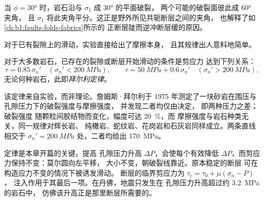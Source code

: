 当 $\phi = \ang{30}$ 时，岩石沿与 $\sigma_1$ 成 \ang{30} 的平面破裂，
两个可能的破裂面彼此成 \ang{60} 夹角，
且 $\sigma_1$ 将此夹角平分。这正是野外所见共轭断层之间的夹角，
也解释了如\cref{ch:b1:faults-folds-fabrics}所示的
正断层陡而逆冲断层缓的原因。

对于已有裂隙上的滑动，实验直接给出了摩擦本身，
且其规律出人意料地简单。

\begin{proposition}[拜尔利定律]\label{prop:b1:stress-strain-rheology:byerlee}
对于大多数岩石，已存在的裂隙或断层开始滑动的条件是剪应力
达到下列关系：
\[
  \tau = 0.85\,\sigma_n' \quad (\sigma_n' < \qty{200}{MPa}), \qquad
  \tau = \qty{50}{MPa} + 0.6\,\sigma_n' \quad (\sigma_n' > \qty{200}{MPa}),
\]
无论何种岩石，此即\emph{拜尔利定律}。
\end{proposition}
\admitted

该定律来自实验，而非理论。詹姆斯·拜尔利于
1975 年测定了一块砂岩在围压与孔隙压力下的破裂强度与摩擦强度，
并发现二者均仅由决定，
即两种压力之差；破裂强度
随颗粒间胶结物而变化，幅度可达 \qty{20}{\percent}，而
摩擦强度与岩石种类无关，同一规律对辉长岩、
纯橄岩、蛇纹岩、花岗岩和石灰岩同样成立。两条直线相交于
$\sigma_n' = \qty{200}{MPa}$ 处，二者均给出 \qty{170}{MPa}。

定律是本章开篇的关键。提高
孔隙压力升高 $\Delta P$，会使每个有效降低
$\Delta P$，而剪应力保持不变：莫尔圆向左平移，
大小不变，朝破裂线靠近。原本稳定的断层
可在构造应力不变的情况下被诱发滑动。
断层的临界剪应力为 $\tau_c = \tau_0 + \mu(\sigma_n - P)$，
注入作用于其最后一项。在丹佛，地震只发生在
孔隙压力升高超过约 \qty{3.2}{MPa} 的岩石中，
仿佛该升高正是那里断层所需要的。

